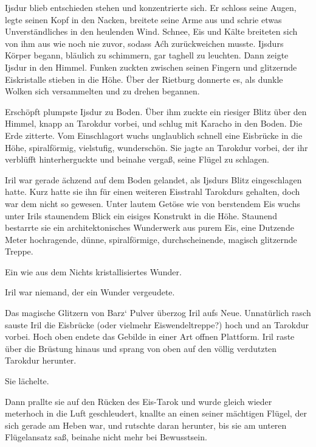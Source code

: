 Ijsdur blieb entschieden stehen und konzentrierte sich. Er schloss seine Augen, legte seinen Kopf in den Nacken, breitete seine Arme aus und schrie etwas Unverständliches in den heulenden Wind. Schnee, Eis und Kälte breiteten sich von ihm aus wie noch nie zuvor, sodass Aćh zurückweichen musste. Ijsdurs Körper begann, bläulich zu schimmern, gar taghell zu leuchten. Dann zeigte Ijsdur in den Himmel. Funken zuckten zwischen seinen Fingern und glitzernde Eiskristalle stieben in die Höhe. Über der Rietburg donnerte es, als dunkle Wolken sich versammelten und zu drehen begannen.

Erschöpft plumpste Ijsdur zu Boden. Über ihm zuckte ein riesiger Blitz über den Himmel, knapp an Tarokdur vorbei, und schlug mit Karacho in den Boden. Die Erde zitterte. Vom Einschlagort wuchs unglaublich schnell eine Eisbrücke in die Höhe, spiralförmig, vielstufig, wunderschön. Sie jagte an Tarokdur vorbei, der ihr verblüfft hinterherguckte und beinahe vergaß, seine Flügel zu schlagen.



\trennzeichen



Iril war gerade ächzend auf dem Boden gelandet, als Ijsdurs Blitz eingeschlagen hatte. Kurz hatte sie ihn für einen weiteren Eisstrahl Tarokdurs gehalten, doch war dem nicht so gewesen. Unter lautem Getöse wie von berstendem Eis wuchs unter Irils staunendem Blick ein eisiges Konstrukt in die Höhe. Staunend bestarrte sie ein architektonisches Wunderwerk aus purem Eis, eine Dutzende Meter hochragende, dünne, spiralförmige, durchscheinende, magisch glitzernde Treppe.

Ein wie aus dem Nichts kristallisiertes Wunder.

Iril war niemand, der ein Wunder vergeudete.

Das magische Glitzern von Barz‘ Pulver überzog Iril aufs Neue. Unnatürlich rasch sauste Iril die Eisbrücke (oder vielmehr Eiswendeltreppe?) hoch und an Tarokdur vorbei. Hoch oben endete das Gebilde in einer Art offnen Plattform. Iril raste über die Brüstung hinaus und sprang von oben auf den völlig verdutzten Tarokdur herunter.

Sie lächelte.

Dann prallte sie auf den Rücken des Eis-Tarok und wurde gleich wieder meterhoch in die Luft geschleudert, knallte an einen seiner mächtigen Flügel, der sich gerade am Heben war, und rutschte daran herunter, bis sie am unteren Flügelansatz saß, beinahe nicht mehr bei Bewusstsein.

